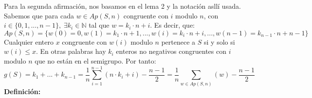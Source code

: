 \documentclass[10pt,spanish]{book}
\begin{document}
Para la segunda afirmación, nos basamos en el lema 2 y la notación asllí usada. Sabemos que para cada $w\in Ap(S,n)$ congruente con $i$ modulo $n$, con $i\in\{0,1,...,n-1\},\;\exists k_{i}\in\mathbb{N}$ tal que $w=k_{i}\cdot n + i$. Es decir, que: 
$$Ap(S,n)=\{w(0)=0, w(1)=k_{1}\cdot n + 1,...,w(i)=k_{i}\cdot n +i,...,w(n-1)=k_{n-1}\cdot n+n-1\}$$
Cualquier entero $x$ congruente con $w(i)$ modulo $n$ pertenece a $S$ si y solo si $w(i)\leq x$. En otras palabras hay $k_{i}$ enteros no negativos congruentes con $i$ modulo $n$ que no están en el semigrupo. Por tanto:
$$ g(S) = k_{1}+...+k_{n-1} = \frac{1}{n}\sum_{i=1}^{n-1}(n\cdot k_{i}+i) -\frac{n-1}{2} = \frac{1}{n}\sum_{w\in Ap(S,n)}(w) -\frac{n-1}{2}$$
\textbf{Definición:} 
\end{document}
